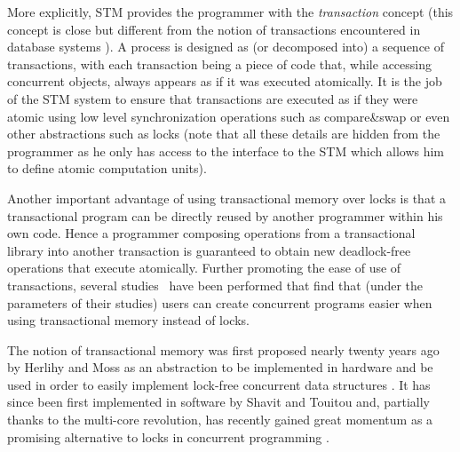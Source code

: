 More explicitly,  STM  
 provides the 
programmer  with the {\it transaction} concept (this concept 
is close but different from the notion of transactions encountered in 
database systems \cite{FFGH08,HCUAGSV07,HL08}).
 A process is designed as 
(or decomposed into)  a sequence of transactions, with each transaction 
being a piece  of code that, while  accessing  concurrent  objects, 
always  appears as if it was  executed atomically.
It  is the job of the 
STM system to ensure that transactions are executed as if they were atomic using low level synchronization
operations such as compare\&swap or even other abstractions such as locks
(note that all these details are hidden from the programmer as he only has access to the interface
to the STM which allows him to define atomic computation units).

Another important advantage of using transactional memory over locks is that a transactional program
can be directly reused by another programmer within his own code.
Hence a programmer composing operations from a transactional library into another 
transaction is guaranteed to obtain new deadlock-free operations that execute atomically.
Further promoting the ease of use of transactions, several studies~\cite{PA11,RHW10}
have been performed that find that (under the parameters of their studies) users can create concurrent programs
easier when using transactional memory instead of locks.


The notion  of   transactional  memory  was
first   proposed  nearly twenty years ago by Herlihy  and Moss 
as an abstraction to be implemented in hardware and be used in order to easily 
implement lock-free concurrent  data structures  \cite{HM93}.  It  has  since  been 
first implemented in software  by Shavit  and  Touitou   \cite{ST97} and, partially thanks
to the multi-core revolution,  has
recently gained great  momentum as  a promising alternative  to locks in
concurrent programming  \cite{FFGH08,HCUAGSV07,LK08,R08}.


